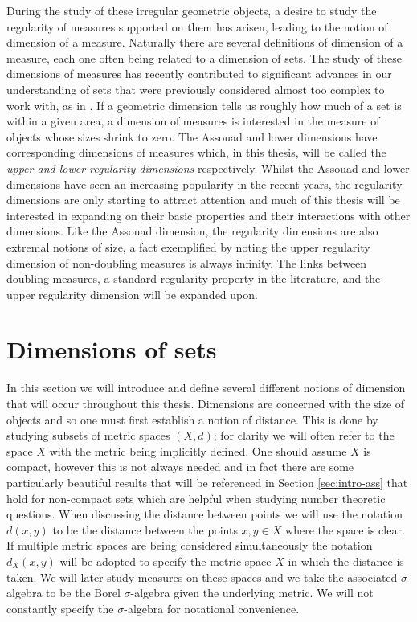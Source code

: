 During the study of these irregular geometric objects, a desire to study the regularity of measures supported on them has arisen, leading to the notion of dimension of a measure. Naturally there are several definitions of dimension of a measure, each one often being related to a dimension of sets. The study of these dimensions of measures has recently contributed to significant advances in our understanding of sets that were previously considered almost too complex to work with, as in \cite{hochman}. If a geometric dimension tells us roughly how much of a set is within a given area, a dimension of measures is interested in the measure of objects whose sizes shrink to zero. The Assouad and lower dimensions have corresponding dimensions of measures which, in this thesis, will be called the \textit{upper and lower regularity dimensions} respectively. Whilst the Assouad and lower dimensions have seen an increasing popularity in the recent years, the regularity dimensions are only starting to attract attention and much of this thesis will be interested in expanding on their basic properties and their interactions with other dimensions. Like the Assouad dimension, the regularity dimensions are also extremal notions of size, a fact exemplified by noting the upper regularity dimension of non-doubling measures is always infinity. The links between doubling measures, a standard regularity property in the literature, and the upper regularity dimension will be expanded upon. 





\section{Dimensions of sets}
\label{sec:intro-sets}

In this section we will introduce and define several different notions of dimension that will occur throughout this thesis. Dimensions are concerned with the size of objects and so one must first establish a notion of distance. This is done by studying subsets of metric spaces $(X,d)$; for clarity we will often refer to the space $X$ with the metric being implicitly defined. One should assume $X$ is compact, however this is not always needed and in fact there are some particularly beautiful results that will be referenced in Section \ref{sec:intro-ass} that hold for non-compact sets which are helpful when studying number theoretic questions. When discussing the distance between points we will use the notation $d(x,y)$ to be the distance between the points $x,y \in X$ where the space is clear. If multiple metric spaces are being considered simultaneously the notation $d_X(x,y)$ will be adopted to specify the metric space $X$ in which the distance is taken. We will later study measures on these spaces and we take the associated $\sigma$-algebra to be the Borel $\sigma$-algebra given the underlying metric. We will not constantly specify the $\sigma$-algebra for notational convenience.

